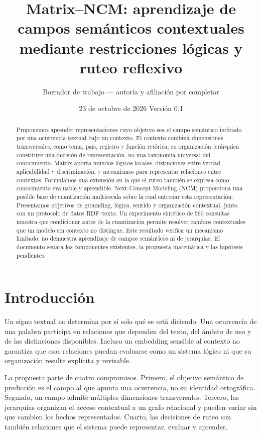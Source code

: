 \documentclass[11pt,a4paper]{article}
\title{Matrix--NCM: aprendizaje de campos semánticos contextuales\newline
mediante restricciones lógicas y ruteo reflexivo}
\author{Borrador de trabajo --- autoría y afiliación por completar}
\date{23 de octubre de 2026 \quad Versión 0.1}
\begin{document}
\maketitle
\begin{abstract}
Proponemos aprender representaciones cuyo objetivo sea el campo semántico
indicado por una ocurrencia textual bajo un contexto. El contexto combina
dimensiones transversales, como tema, país, registro y función retórica; su
organización jerárquica constituye una decisión de representación, no una
taxonomía universal del conocimiento. Matrix aporta mundos lógicos locales,
distinciones entre verdad, aplicabilidad y discriminación, y mecanismos para
representar relaciones entre contextos. Formulamos una extensión en la que el
ruteo también se expresa como conocimiento evaluable y aprendible. Next-Concept
Modeling (NCM) proporciona una posible base de cuantización multiescala sobre la
cual entrenar esta representación. Presentamos objetivos de grounding, lógica,
sentido y organización contextual, junto con un protocolo de datos RDF--texto.
Un experimento sintético de 560 consultas muestra que condicionar antes de la
cuantización permite resolver cambios contextuales que un modelo sin contexto
no distingue. Este resultado verifica un mecanismo limitado: no demuestra
aprendizaje de campos semánticos ni de jerarquías. El documento separa los
componentes existentes, la propuesta matemática y las hipótesis pendientes.
\end{abstract}

\section{Introducción}
Un signo textual no determina por sí solo qué se está diciendo. Una ocurrencia
de una palabra participa en relaciones que dependen del texto, del ámbito de
uso y de las distinciones disponibles. Incluso un embedding sensible al contexto
no garantiza que esas relaciones puedan evaluarse como un sistema lógico ni que
su organización resulte explícita y revisable.

La propuesta parte de cuatro compromisos. Primero, el objetivo semántico de
predicción es el campo al que apunta una ocurrencia, no su identidad ortográfica.
Segundo, un campo admite múltiples dimensiones transversales. Tercero, las
jerarquías organizan el acceso contextual a un grafo relacional y pueden variar
sin que cambien los hechos representados. Cuarto, las decisiones de ruteo son
también relaciones que el sistema puede representar, evaluar y aprender.
\end{document}
